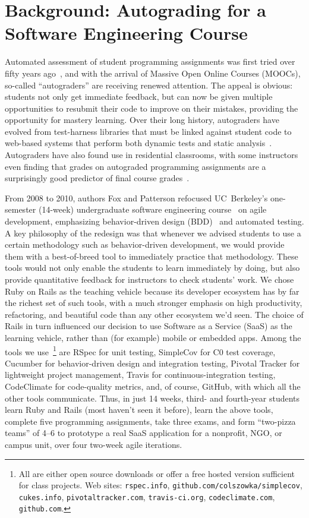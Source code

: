 \section{Background: Autograding for a Software Engineering Course}

Automated assessment of student programming assignments was first tried
over fifty years ago~\cite{hollingsworth60}, and with the arrival of
Massive Open Online Courses (MOOCs), so-called ``autograders'' are
receiving renewed attention.  The appeal is obvious: students not only
get immediate feedback, but can now be given multiple opportunities to
resubmit their code to improve on their mistakes, providing the
opportunity for mastery learning.  Over their long history, autograders
have evolved from test-harness libraries that must be linked against
student code to web-based systems that perform both dynamic tests and static
analysis~\cite{douce-2005-autograding-survey}.  Autograders have also
found use in residential classrooms, with some instructors even finding
that grades on autograded programming assignments are a surprisingly good
predictor of final course grades~\cite{navrat2014}.


From 2008 to 2010, authors Fox and Patterson refocused
UC~Berkeley's one-semester (14-week) undergraduate software engineering
course~\cite{crossing_the_software_chasm,agile_sw_curriculum} on agile
development, emphasizing
behavior-driven design (BDD)~\cite{bdd} and automated testing.  A key
 philosophy of the redesign
was that whenever we advised students to use a certain
methodology such as behavior-driven
development, we would provide them with a best-of-breed tool to immediately
practice that methodology.  These tools would not only enable the
students to learn immediately by doing, but also provide quantitative
feedback for instructors to check students' work.  
We chose Ruby on Rails as the teaching vehicle because its developer
ecosystem has by far the richest set of such tools, with a much stronger
emphasis on high productivity, refactoring, and beautiful code than any
other ecosystem we'd seen.
The choice of Rails in turn influenced our decision to use Software as a
Service (SaaS) as the learning vehicle, rather than (for example) mobile
or embedded apps.
Among the tools we
use~\footnote{All are either open source downloads or offer a free
hosted version sufficient for class projects.  Web
sites: \texttt{rspec.info}, \texttt{github.com/colszowka/simplecov}, \texttt{cukes.info}, \texttt{pivotaltracker.com}, \texttt{travis-ci.org}, \texttt{codeclimate.com}, \texttt{github.com}.} 
are 
RSpec for unit testing,
SimpleCov for C0 test coverage,
Cucumber for behavior-driven design and integration testing,
Pivotal Tracker for lightweight project management,
Travis for continuous-integration testing,
CodeClimate for code-quality metrics,
and, of course, GitHub, with which all the
other tools communicate.  
Thus, in just 14 weeks, third- and fourth-year students learn Ruby
and Rails (most haven't seen it before), learn the above tools, complete
five programming assignments, take three exams, and form ``two-pizza
teams'' of 4--6 to prototype a real SaaS application for a nonprofit,
NGO, or campus unit, over four two-week agile iterations.

